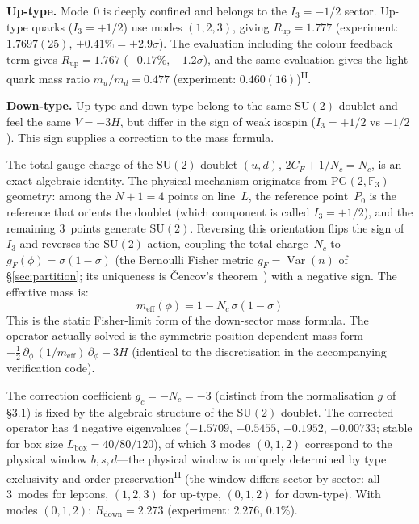 \documentclass[12pt,a4paper]{article}
\newcommand{\PII}{\textsuperscript{\textup{II}}}
\begin{document}
\noindent\textbf{Up-type.}\;
Mode~0 is deeply confined and belongs to the $I_3 = -1/2$ sector.
Up-type quarks ($I_3 = +1/2$) use modes $(1,2,3)$, giving
$R_\mathrm{up} = 1.777$ (experiment: $1.7697(25)$, $+0.41\% = +2.9\sigma$).
The evaluation including the colour feedback term gives
$R_\mathrm{up} = 1.767$ ($-0.17\%$, $-1.2\sigma$), and the same evaluation gives the
light-quark mass ratio $m_u/m_d = 0.477$ (experiment: $0.460(16)$)\PII{}.

\noindent\textbf{Down-type.}\;
Up-type and down-type belong to the same $\mathrm{SU}(2)$
doublet and feel the same $V = -3H$, but differ in the sign of
weak isospin ($I_3 = +1/2$ vs $-1/2$).
This sign supplies a correction to the mass formula.

The total gauge charge of the $\mathrm{SU}(2)$ doublet $(u, d)$, $2C_F + 1/N_c = N_c$, is an exact algebraic identity.
The physical mechanism originates from
$\mathrm{PG}(2,\mathbb{F}_3)$ geometry: among the $N{+}1 = 4$ points on
line~$L$, the reference point~$P_0$ is the reference that orients the
doublet (which component is called $I_3 = +1/2$), and the
remaining 3~points generate $\mathrm{SU}(2)$. Reversing this
orientation flips the sign of $I_3$ and reverses the $\mathrm{SU}(2)$
action, coupling the total charge~$N_c$ to $g_F(\phi) = \sigma(1{-}\sigma)$
(the Bernoulli Fisher metric $g_F = \operatorname{Var}(n)$ of \S\ref{sec:partition}; its uniqueness is \v{C}encov's theorem~\cite{cencov}) with
a negative sign.
The effective mass is:
\begin{equation}
  m_\mathrm{eff}(\phi) = 1 - N_c\,\sigma(1{-}\sigma)
\end{equation}
This is the static Fisher-limit form of the down-sector mass formula. The operator actually solved is the symmetric position-dependent-mass form $-\tfrac{1}{2}\,\partial_\phi\,(1/m_\mathrm{eff})\,\partial_\phi - 3H$ (identical to the discretisation in the accompanying verification code).

The correction coefficient $g_c = -N_c = -3$ (distinct from the normalisation $g$ of \S3.1) is fixed by the algebraic structure of the $\mathrm{SU}(2)$ doublet. The corrected operator has 4 negative eigenvalues ($-1.5709$, $-0.5455$, $-0.1952$, $-0.00733$; stable for box size $L_\mathrm{box} = 40/80/120$), of which 3 modes $(0,1,2)$ correspond to the physical window $b, s, d$---the physical window is uniquely determined by type exclusivity and order preservation\PII{} (the window differs sector by sector: all 3~modes for leptons, $(1,2,3)$ for up-type, $(0,1,2)$ for down-type). With modes $(0,1,2)$: $R_\mathrm{down} = 2.273$ (experiment: $2.276$, $0.1\%$).
\end{document}
